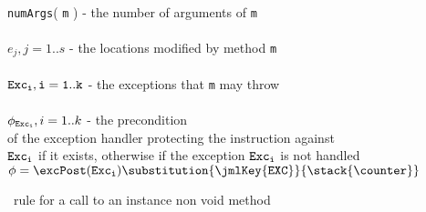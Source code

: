 \begin{figure}[!ht]
\\
\texttt{numArgs}( \texttt{m} ) -  the    number   of   arguments   of   \texttt{m} \\  
\\
$e_{j} , j = 1 .. s$ - the   locations   modified   by   method   \texttt{m} \\
\\
$\tt{Exc_i}, i = 1..k$ -  the   exceptions   that  \texttt{m} may  throw \\
\\
$\phi_{\tt{Exc_i}}, i = 1..k$ -   the   precondition  \\
\Myspace of the exception handler protecting the instruction against \\
\Myspace $\tt{Exc_i} $  if   it    exists,   otherwise if   the exception   $\tt{Exc_i}$ is not handled    \\
\Myspace     $ \phi = \excPost( \tt{Exc_i}) \substitution{ \jmlKey{EXC}}{ \stack{\counter}}$

\caption{\wpi \ rule for a call to an instance non void method}
\label{wpInv}
\end{figure}
